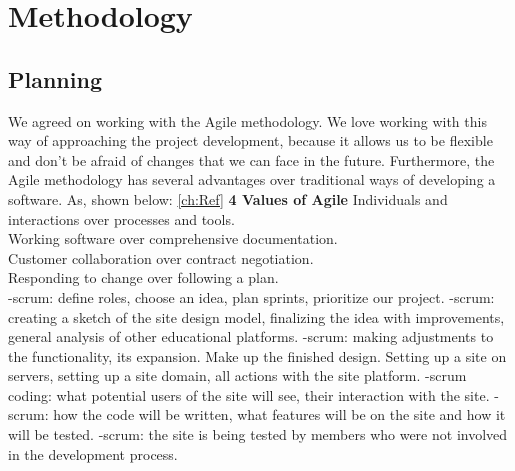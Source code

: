 \chapter{Methodology}\label{ch:B}
\section{Planning}
We agreed on working with the Agile methodology. We love working with this way of approaching the project development, because it allows us to be flexible and don't be afraid of changes that we can face in the future. Furthermore, the Agile methodology has several advantages over traditional ways of developing a software. As, shown below: \cref{ch:Ref} \newline
\large \textbf {4 Values of Agile}\newline
Individuals and interactions over processes and tools.\\
Working software over comprehensive documentation.\\
Customer collaboration over contract negotiation.\\
Responding to change over following a plan.\\
\vspace{0.2cm}
-scrum: define roles, choose an idea, plan sprints, prioritize our project.
-scrum: creating a sketch of the site design model, finalizing the idea with improvements, general analysis of other educational platforms.
-scrum: making adjustments to the functionality, its expansion. Make up the finished design. Setting up a site on servers, setting up a site domain, all actions with the site platform.
-scrum coding: what potential users of the site will see, their interaction with the site.
-scrum: how the code will be written, what features will be on the site and how it will be tested.
-scrum: the site is being tested by members who were not involved in the development process.
